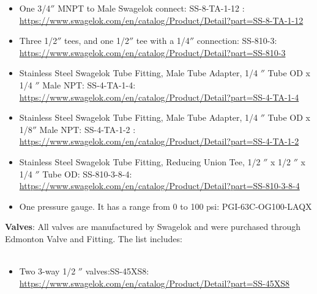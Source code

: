 \begin{itemize}
\item One 3/4$''$ MNPT to Male Swagelok connect: SS-8-TA-1-12 : \url{https://www.swagelok.com/en/catalog/Product/Detail?part=SS-8-TA-1-12}
\end{itemize}

\begin{itemize}
\item Three   1/2$''$ tees, and one  1/2$''$ tee with a 1/4$''$ connection: SS-810-3: \url{https://www.swagelok.com/en/catalog/Product/Detail?part=SS-810-3}
\end{itemize}

\begin{itemize}
\item Stainless Steel Swagelok Tube Fitting, Male Tube Adapter, 1/4 $''$ Tube OD x 1/4 $''$ Male NPT: SS-4-TA-1-4: \url{https://www.swagelok.com/en/catalog/Product/Detail?part=SS-4-TA-1-4}
\end{itemize}

\begin{itemize}
\item Stainless Steel Swagelok Tube Fitting, Male Tube Adapter, 1/4 $''$  Tube OD x 1/8$''$ Male NPT: SS-4-TA-1-2 : \url{https://www.swagelok.com/en/catalog/Product/Detail?part=SS-4-TA-1-2}
\end{itemize}

\begin{itemize}
\item Stainless Steel Swagelok Tube Fitting, Reducing Union Tee, 1/2 $''$  x 1/2 $''$  x 1/4 $''$ Tube OD: SS-810-3-8-4: \url{https://www.swagelok.com/en/catalog/Product/Detail?part=SS-810-3-8-4}
\end{itemize}

\begin{itemize}
\item One pressure gauge. It has a range from 0 to 100 psi: PGI-63C-OG100-LAQX
\end{itemize} 
\textbf{Valves}: All valves are manufactured by Swagelok and were purchased through Edmonton Valve and Fitting. The list includes:\\
\\
\begin{itemize}
\item Two 3-way 1/2 $''$ valves:SS-45XS8: \url{https://www.swagelok.com/en/catalog/Product/Detail?part=SS-45XS8}
\end{itemize}

